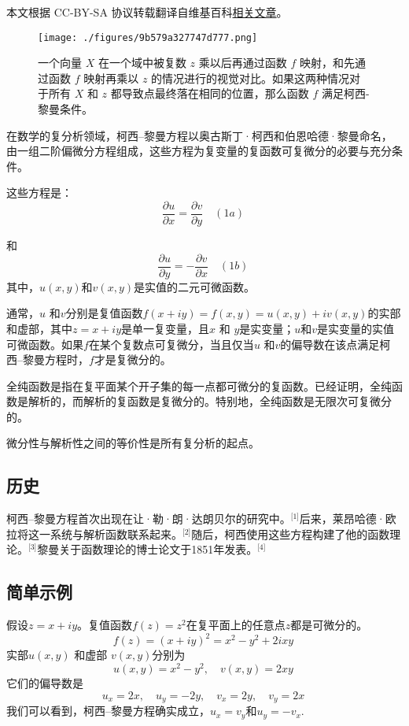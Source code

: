 
本文根据 CC-BY-SA 协议转载翻译自维基百科\href{https://en.wikipedia.org/wiki/Cauchy\%E2\%80\%93Riemann_equations}{相关文章}。

\begin{figure}[ht]
\centering
\texttt{[image: ./figures/9b579a327747d777.png]}
\caption{一个向量 \( X \) 在一个域中被复数 \( z \) 乘以后再通过函数 \( f \) 映射，和先通过函数 \( f \) 映射再乘以 \( z \) 的情况进行的视觉对比。如果这两种情况对于所有 \( X \) 和 \( z \) 都导致点最终落在相同的位置，那么函数 \( f \) 满足柯西-黎曼条件。} \label{fig_KExiLM_1}
\end{figure}
在数学的复分析领域，柯西–黎曼方程以奥古斯丁·柯西和伯恩哈德·黎曼命名，由一组二阶偏微分方程组成，这些方程为复变量的复函数可复微分的必要与充分条件。

这些方程是：
\[
\frac{\partial u}{\partial x} = \frac{\partial v}{\partial y} \quad (1a)~
\]

和
\[
\frac{\partial u}{\partial y} = -\frac{\partial v}{\partial x} \quad (1b)~
\]
其中，\(u(x, y)\)和\(v(x, y)\)是实值的二元可微函数。

通常，\(u\) 和\(v\)分别是复值函数\(f(x+iy)=f(x,y)=u(x,y)+iv(x,y)\)的实部和虚部，其中\( z = x + iy \)是单一复变量，且\( x \) 和 \( y \)是实变量；\( u \)和\( v \)是实变量的实值可微函数。如果\( f \)在某个复数点可复微分，当且仅当\( u \) 和\( v \)的偏导数在该点满足柯西–黎曼方程时，\( f \)才是复微分的。

全纯函数是指在复平面某个开子集的每一点都可微分的复函数。已经证明，全纯函数是解析的，而解析的复函数是复微分的。特别地，全纯函数是无限次可复微分的。

微分性与解析性之间的等价性是所有复分析的起点。
\subsection{历史}  
柯西–黎曼方程首次出现在让·勒·朗·达朗贝尔的研究中。\(^\text{[1]}\)后来，莱昂哈德·欧拉将这一系统与解析函数联系起来。\(^\text{[2]}\)随后，柯西使用这些方程构建了他的函数理论。\(^\text{[3]}\)黎曼关于函数理论的博士论文于1851年发表。\(^\text{[4]}\)
\subsection{简单示例}  
假设\( z = x + iy \)。复值函数\( f(z) = z^2 \)在复平面上的任意点\( z \)都是可微分的。  
\[
f(z) = (x + iy)^2 = x^2 - y^2 + 2ixy~
\]
实部\( u(x, y) \) 和虚部 \( v(x, y) \)分别为  
\[
u(x, y) = x^2 - y^2, \quad v(x, y) = 2xy~
\]
它们的偏导数是  
\[
u_x = 2x, \quad u_y = -2y, \quad v_x = 2y, \quad v_y = 2x~
\]
我们可以看到，柯西–黎曼方程确实成立，\(u_x = v_y\)和\(u_y = -v_x\).
